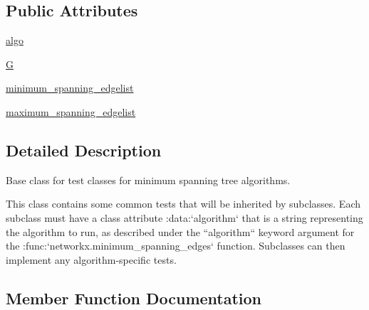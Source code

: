 \subsection*{Public Attributes}
\begin{DoxyCompactItemize}
\item 
\hyperlink{classnetworkx_1_1algorithms_1_1tree_1_1tests_1_1test__mst_1_1MinimumSpanningTreeTestBase_ac35d3d7e3790e9319a7fc2d6abbb94ad}{algo}
\item 
\hyperlink{classnetworkx_1_1algorithms_1_1tree_1_1tests_1_1test__mst_1_1MinimumSpanningTreeTestBase_a1f3c508cc693dd2c7fc61b7476b5f387}{G}
\item 
\hyperlink{classnetworkx_1_1algorithms_1_1tree_1_1tests_1_1test__mst_1_1MinimumSpanningTreeTestBase_abf3bbcdddf69db3dba52f6fc142efe20}{minimum\+\_\+spanning\+\_\+edgelist}
\item 
\hyperlink{classnetworkx_1_1algorithms_1_1tree_1_1tests_1_1test__mst_1_1MinimumSpanningTreeTestBase_a8b06516e4f4385321ff77102cd1af270}{maximum\+\_\+spanning\+\_\+edgelist}
\end{DoxyCompactItemize}


\subsection{Detailed Description}
\begin{DoxyVerb}Base class for test classes for minimum spanning tree algorithms.

This class contains some common tests that will be inherited by
subclasses. Each subclass must have a class attribute
:data:`algorithm` that is a string representing the algorithm to
run, as described under the ``algorithm`` keyword argument for the
:func:`networkx.minimum_spanning_edges` function.  Subclasses can
then implement any algorithm-specific tests.\end{DoxyVerb}
 

\subsection{Member Function Documentation}
\mbox{\label{classnetworkx_1_1algorithms_1_1tree_1_1tests_1_1test__mst_1_1MinimumSpanningTreeTestBase_ae77ee8e9a98778766e72757a2decbf06}} 
